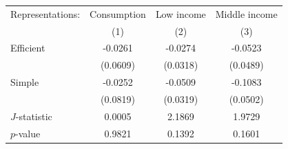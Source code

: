 \begin{threeparttable}
\begin{tabular}{l | ccc}
\toprule
Representations: & \multicolumn{1}{c}{Consumption} & \multicolumn{1}{c}{Low income} & \multicolumn{1}{c}{Middle income} \\
& (1) & (2) & (3) \\
\midrule
  Efficient & -0.0261 & -0.0274 & -0.0523 \\
           & (0.0609) & (0.0318) & (0.0489) \\
\addlinespace[0.3em]
  Simple & -0.0252 & -0.0509 & -0.1083 \\
           & (0.0819) & (0.0319) & (0.0502) \\
\midrule
  $J$-statistic & 0.0005 & 2.1869 & 1.9729 \\
  $p$-value     & 0.9821 & 0.1392 & 0.1601 \\
\bottomrule
\end{tabular}
\end{threeparttable}

